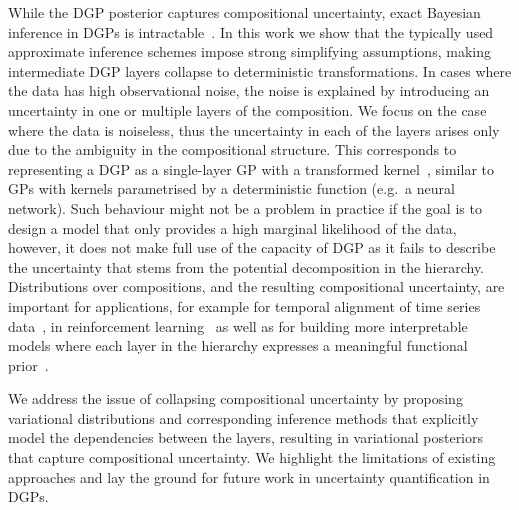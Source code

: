 While the DGP posterior captures compositional uncertainty, exact Bayesian inference in DGPs is intractable~\parencite{Damianou:2013}.
In this work we show that the typically used approximate inference schemes \parencite[e.g.][]{Salimbeni:2017} impose strong simplifying assumptions, making intermediate DGP layers collapse to deterministic transformations.
In cases where the data has high observational noise, the noise is explained by introducing an uncertainty in one or multiple layers of the composition.
We focus on the case where the data is noiseless, thus the uncertainty in each of the layers arises only due to the ambiguity in the compositional structure.
This corresponds to representing a DGP as a single-layer GP with a transformed kernel~\parencite{Dunlop:2018}, similar to GPs with kernels parametrised by a deterministic function (e.g.\ a neural network).
Such behaviour might not be a problem in practice if the goal is to design a model that only provides a high marginal likelihood of the data, however, it does not make full use of the capacity of DGP as it fails to describe the uncertainty that stems from the potential decomposition in the hierarchy.
Distributions over compositions, and the resulting compositional uncertainty, are important for applications, for example for temporal alignment of time series data~\parencite{Kaiser:2018, Kazlauskaite:2019}, in reinforcement learning~\parencite{Jin:2017} as well as for building more interpretable models where each layer in the hierarchy expresses a meaningful functional prior~\parencite{Sun:2019}.

We address the issue of collapsing compositional uncertainty by proposing variational distributions and corresponding inference methods that explicitly model the dependencies between the layers, resulting in variational posteriors that capture compositional uncertainty.
We highlight the limitations of existing approaches and lay the ground for future work in uncertainty quantification in DGPs.

